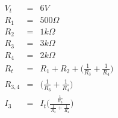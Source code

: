 \documentclass[preview]{standalone}
\begin{document}
\begin{eqnarray*}
V_t &=& 6V \\
R_1 &=& 500 \Omega \\
R_2 &=& 1k \Omega \\
R_3 &=& 3k \Omega \\
R_4 &=& 2k \Omega \\
R_t &=& R_1 + R_2 + \big( \frac{1}{R_3} + \frac{1}{R_4} \big) \\
R_{3,4} &=& \big( \frac{1}{R_3} + \frac{1}{R_4} \big) \\
I_3 &=& I_t \big( \frac{ \frac{1}{R_3} }{ \frac{1}{R_3} + \frac{1}{R_4} } \big) \\
\end{eqnarray*}
\end{document}
